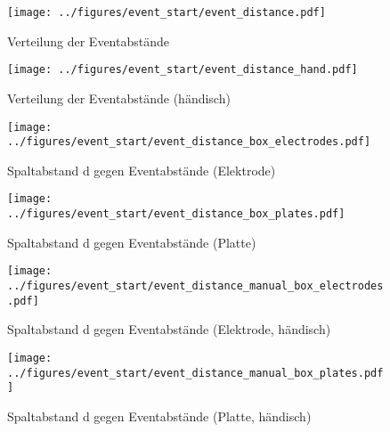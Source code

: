 \begin{figure}[htbp]
    \centering
    \begin{minipage}[t]{0.47\textwidth}
      \centering
      \texttt{[image: ../figures/event\_start/event\_distance.pdf]}
      \caption{Verteilung der Eventabstände}
      \label{fig:histogram-eventdistance}
    \end{minipage}
 \begin{minipage}[t]{0.47\textwidth}
      \centering
      \texttt{[image: ../figures/event\_start/event\_distance\_hand.pdf]}
      \caption{Verteilung der Eventabstände (händisch)}
      \label{fig:histogram-eventdistance-hand}
  \end{minipage}
\end{figure}

\begin{figure}[htbp]
    \centering
    \begin{minipage}[t]{0.47\textwidth}
      \centering
      \texttt{[image: ../figures/event\_start/event\_distance\_box\_electrodes.pdf]}
      \caption{Spaltabstand d gegen Eventabstände (Elektrode)}
      \label{fig:box-eventdistance-electrode}
   \end{minipage}
 \begin{minipage}[t]{0.47\textwidth}
      \centering
      \texttt{[image: ../figures/event\_start/event\_distance\_box\_plates.pdf]}
      \caption{Spaltabstand d gegen Eventabstände (Platte)}
      \label{fig:box-eventdistance-plate}
  \end{minipage}
\begin{minipage}[t]{0.47\textwidth}
      \centering
      \texttt{[image: ../figures/event\_start/event\_distance\_manual\_box\_electrodes.pdf]}
      \caption{Spaltabstand d gegen Eventabstände (Elektrode, händisch)}
      \label{fig:box-eventdistance-electrode-hand}
   \end{minipage}
 \begin{minipage}[t]{0.47\textwidth}
      \centering
      \texttt{[image: ../figures/event\_start/event\_distance\_manual\_box\_plates.pdf]}
      \caption{Spaltabstand d gegen Eventabstände (Platte, händisch)}
      \label{fig:box-eventdistance-plate-hand}
  \end{minipage}

\end{figure}

